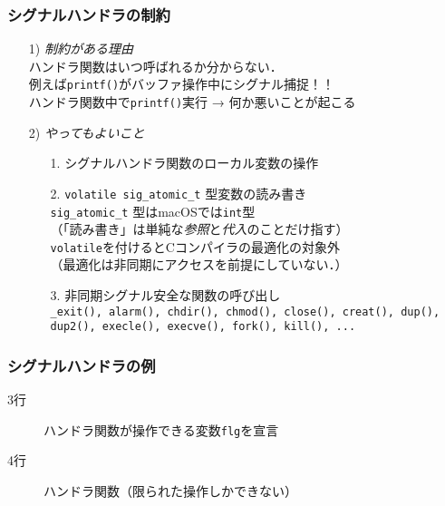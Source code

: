 \documentclass{beamer}                 %
\begin{document}
\begin{frame}[fragile]
  \frametitle{シグナルハンドラの制約}
  \begin{enumerate}
  \item[1)] \emph{制約がある理由} \\
    ハンドラ関数はいつ呼ばれるか分からない．\\
    例えば\texttt{printf()}がバッファ操作中にシグナル捕捉！！ \\
    ハンドラ関数中で\texttt{printf()}実行 → 何か悪いことが起こる
    \vfill
  \item[2)] \emph{やってもよいこと} \\
    \begin{enumerate}
    \item[1.] シグナルハンドラ関数のローカル変数の操作
    \item[2.] \texttt{volatile sig\_atomic\_t} 型変数の読み書き\\
      \texttt{sig\_atomic\_t} 型はmacOSでは\texttt{int}型\\
      （「読み書き」は単純な\emph{参照}と\emph{代入}のことだけ指す）\\
      \texttt{volatile}を付けるとCコンパイラの最適化の対象外\\
      （最適化は非同期にアクセスを前提にしていない．）\\
    \item[3.] 非同期シグナル安全な関数の呼び出し\\
      \texttt{\_exit(), alarm(), chdir(), chmod(), close(), creat(), dup(),
        dup2(), execle(), execve(), fork(), kill(), ...}
    \end{enumerate}
  \end{enumerate}
\end{frame}

\begin{frame}[fragile]
  \frametitle{シグナルハンドラの例}
  \begin{quote}
  \end{quote}

  \begin{description}
  \item[3行] ハンドラ関数が操作できる変数\texttt{flg}を宣言
  \item[4行] ハンドラ関数（限られた操作しかできない）
  \end{description}
\end{frame}
\end{document}
